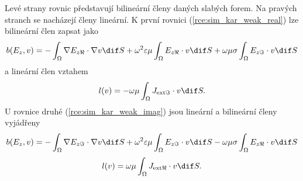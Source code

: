 Levé strany rovnic představují bilineární členy daných slabých forem. Na pravých stranch se nacházejí členy lineární. K první rovnici (\ref{rce:sim_kar_weak_real}) lze bilineární člen zapsat jako
\begin{equation}
	b(E_{z},v) = -\int_{\Omega}\nabla E_{z\Re}\cdot\nabla v \dif S + \omega^{2}\varepsilon\mu\int_{\Omega} E_{z\Re}\cdot v\dif S + \omega\mu\sigma\int_{\Omega} E_{z\Im}\cdot v\dif S
	\label{rce:sim_kar_bilinear_real} 
\end{equation}
a lineární člen vztahem
\begin{equation}
	l(v) = - \omega\mu \int_{\Omega}J_{\mathrm{ext}\Im}\cdot v \dif S.
	\label{rce:sim_kar_linear_real}
\end{equation}
U rovnice druhé (\ref{rce:sim_kar_weak_imag}) jsou lineární a bilineární členy vyjádřeny
\begin{equation}
	b(E_{z},v) = -\int_{\Omega}\nabla E_{z\Im}\cdot\nabla v\dif S + \omega^{2}\varepsilon\mu\int_{\Omega} E_{z\Im}\cdot v\dif S - \omega\mu\sigma\int_{\Omega} E_{z\Re}\cdot v\dif S
	\label{rce:sim_kar_bilinear_imag}	
\end{equation}
\begin{equation}
	l(v) = \omega\mu \int_{\Omega}J_{\mathrm{ext}\Re}\cdot v \dif S.
	\label{rce:sim_kar_linear_imag}
\end{equation}

